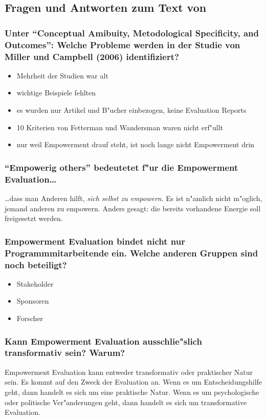 \subsection{Fragen und Antworten zum Text von \textcite{fetterman_empowerment_2007}}
\subsubsection{Unter ``Conceptual Amibuity, Metodological Specificity, and Outcomes'': Welche Probleme werden in der Studie von Miller und Campbell (2006) identifiziert?}
\begin{itemize}
        \item Mehrheit der Studien war alt
        \item wichtige Beispiele fehlten
        \item es wurden nur Artikel und B"ucher einbezogen, keine Evaluation Reports
        \item 10 Kriterien von Fetterman und Wandersman waren nicht erf"ullt
        \item nur weil Empowerment drauf steht, ist noch lange nicht Empowerment drin
\end{itemize}

\subsubsection{``Empowerig others'' bedeutetet f"ur die Empowerment Evaluation\ldots}
\ldots dass man Anderen hilft, \emph{sich selbst zu empowern}. Es ist n"amlich nicht m"oglich, jemand anderen zu empowern. Anders gesagt: die bereits vorhandene Energie soll freigesetzt werden.

\subsubsection{Empowerment Evaluation bindet nicht nur Programmmitarbeitende ein. Welche anderen Gruppen sind noch beteiligt?}
\begin{itemize}
        \item Stakeholder
        \item Sponsoren
        \item Forscher
\end{itemize}

\subsubsection{Kann Empowerment Evaluation ausschlie"slich transformativ sein? Warum?}
Empowerment Evaluation kann entweder transformativ oder praktischer Natur sein. Es kommt auf den Zweck der Evaluation an. Wenn es um Entscheidungshilfe geht, dann handelt es sich um eine praktische Natur. Wenn es um psychologische oder politische Ver"anderungen geht, dann handelt es sich um transformative Evaluation.

